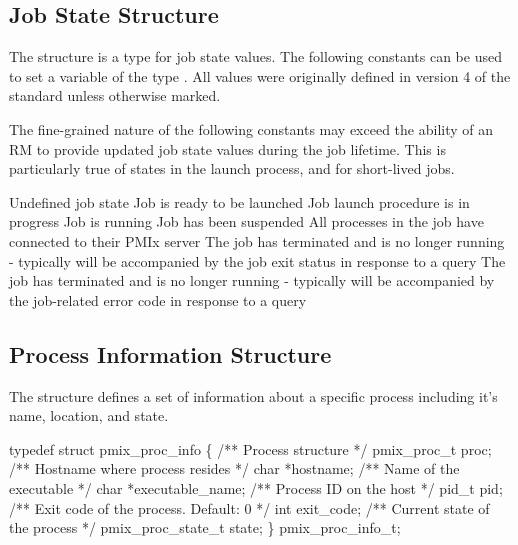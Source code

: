 \subsection{Job State Structure}
\label{api:struct:jobstate}

The  structure is a  type for job state values. The following constants can be used to set a variable of the type . All values were originally defined in version 4 of the standard unless otherwise marked.

\adviceuserstart
The fine-grained nature of the following constants may exceed the ability of an \ac{RM} to provide updated job state values during the job lifetime. This is particularly true of states in the launch process, and for short-lived jobs.
\adviceuserend

\begin{constantdesc}
%
Undefined job state
%
Job is ready to be launched
%
Job launch procedure is in progress
%
Job is running
%
Job has been suspended
%
All processes in the job have connected to their \ac{PMIx} server
%
The job has terminated and is no longer running - typically will
be accompanied by the job exit status in response to a query
%
The job has terminated and is no longer running - typically will
be accompanied by the job-related error code in response to a query
%
\end{constantdesc}


\subsection{Process Information Structure}

The  structure defines a set of information about a specific process including it's name, location, and state.

\cspecificstart
\begin{codepar}
typedef struct pmix_proc_info \{
    /** Process structure */
    pmix_proc_t proc;
    /** Hostname where process resides */
    char *hostname;
    /** Name of the executable */
    char *executable_name;
    /** Process ID on the host */
    pid_t pid;
    /** Exit code of the process. Default: 0 */
    int exit_code;
    /** Current state of the process */
    pmix_proc_state_t state;
\} pmix_proc_info_t;
\end{codepar}
\cspecificend


